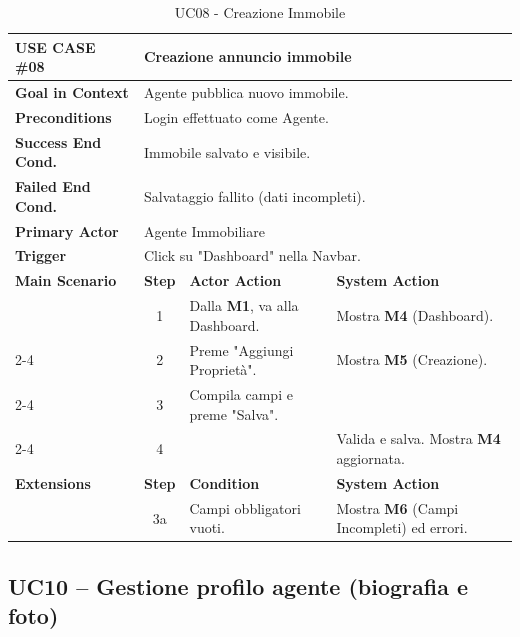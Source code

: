 \documentclass[a4paper,11pt]{report}
\begin{document}
\begin{table}[ht]
\centering
\small
\setlength{\tabcolsep}{3pt}
\renewcommand{\arraystretch}{1.3}
\noindent
\begin{tabularx}{\linewidth}{|p{3cm}|c|X|X|}
\hline
\textbf{USE CASE \#08} & \multicolumn{3}{l|}{\textbf{Creazione annuncio immobile}} \\ \hline
\textbf{Goal in Context} & \multicolumn{3}{l|}{Agente pubblica nuovo immobile.} \\ \hline
\textbf{Preconditions} & \multicolumn{3}{l|}{Login effettuato come Agente.} \\ \hline
\textbf{Success End Cond.} & \multicolumn{3}{l|}{Immobile salvato e visibile.} \\ \hline
\textbf{Failed End Cond.} & \multicolumn{3}{l|}{Salvataggio fallito (dati incompleti).} \\ \hline
\textbf{Primary Actor} & \multicolumn{3}{l|}{Agente Immobiliare} \\ \hline
\textbf{Trigger} & \multicolumn{3}{l|}{Click su "Dashboard" nella Navbar.} \\ \hline
\textbf{Main Scenario} & \textbf{Step} & \textbf{Actor Action} & \textbf{System Action} \\ \hline 
 & 1 & Dalla \textbf{M1}, va alla Dashboard. & Mostra \textbf{M4} (Dashboard). \\ \cline{2-4} 
 & 2 & Preme "Aggiungi Proprietà". & Mostra \textbf{M5} (Creazione). \\ \cline{2-4} 
 & 3 & Compila campi e preme "Salva". &  \\ \cline{2-4} 
 & 4 & & Valida e salva. Mostra \textbf{M4} aggiornata. \\ \hline
\textbf{Extensions} & \textbf{Step} & \textbf{Condition} & \textbf{System Action} \\ \hline 
 & 3a & Campi obbligatori vuoti. & Mostra \textbf{M6} (Campi Incompleti) ed errori. \\ \hline
\end{tabularx}
\caption{UC08 - Creazione Immobile}
\end{table}

\pagebreak

\subsection*{UC10 -- Gestione profilo agente (biografia e foto)}
\end{document}
